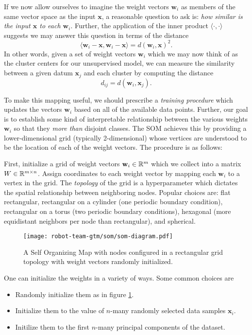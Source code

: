 If we now allow ourselves to imagine the weight vectors $\mathbf{w}_i$ as members of the same vector space as the input $\mathbf{x}$, a reasonable question to ask is: \textit{how similar is the input $\mathbf{x}$ to each $\mathbf{w}_i$}. Further, the application of the inner product $\langle \cdot,\cdot \rangle$ suggests we may answer this question in terms of the distance
\begin{equation}
    \langle \mathbf{w}_i-\mathbf{x},  \mathbf{w}_i-\mathbf{x}\rangle = d(\mathbf{w}_i, \mathbf{x})^2.
\end{equation}
In other words, given a set of weight vectors $\mathbf{w}_i$ which we may now think of as the cluster centers for our unsupervised model, we can measure the similarity between a given datum $\mathbf{x}_j$ and each cluster by computing the distance
\begin{equation}
    d_{ij} = d\left(\mathbf{w}_i, \mathbf{x}_j \right).
\end{equation}

To make this mapping useful, we should prescribe a \textit{training procedure} which updates the vectors $\mathbf{w}_i$ based on all of the available data points. Further, our goal is to establish some kind of interpretable relationship between the various weights $\mathbf{w}_i$ so that they \textit{more than} disjoint classes. The SOM achieves this by providing a lower-dimensional grid (typically 2-dimensional) whose vertices are understood to be the location of each of the weight vectors. The procedure is as follows:

First, initialize a grid of weight vectors $\mathbf{w}_i\in\mathbb{R}^m$ which we collect into a matrix $W\in\mathbb{R}^{m\times n}$. Assign coordinates to each weight vector by mapping each $\mathbf{w}_i$ to a vertex in the grid. The \textit{topology} of the grid is a hyperparameter which dictates the spatial relationship between neighboring nodes. Popular choices are: flat rectangular, rectangular on a cylinder (one periodic boundary condition), rectangular on a torus (two periodic boundary conditions), hexagonal (more equidistant neighbors per node than rectangular), and spherical.
\begin{figure}[h]
  \centering
  \texttt{[image: robot-team-gtm/som/som-diagram.pdf]}
  \caption{A Self Organizing Map with nodes configured in a rectangular grid topology with weight vectors randomly initialized.}
  \label{fig:som-diagram}
\end{figure}
One can initialize the weights in a variety of ways. Some common choices are
\begin{itemize}
\item Randomly initialize them as in figure \ref{fig:som-diagram}.
\item Initialize them to the value of $n$-many randomly selected data samples $\mathbf{x}_i$.
\item Initilize them to the first $n$-many principal components of the dataset.
\end{itemize}

